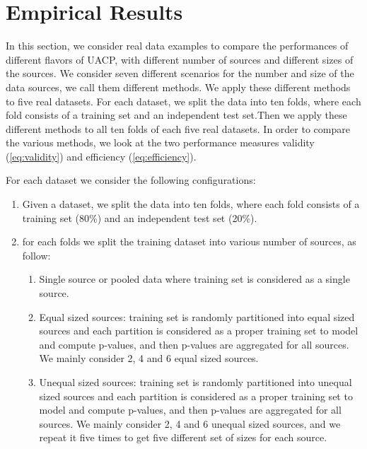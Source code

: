 \documentclass[main]{subfiles}
\begin{document}
\section{Empirical Results}\label{sec:results}
In this section, we consider real data examples to compare the performances of different flavors of UACP, with different number of sources and different sizes of the sources. We consider seven different scenarios for the number and size of the data sources, we call them different methods.  We apply these different methods to five real datasets. For each dataset, we split the data into ten folds, where each fold consists of a training set and an independent test set.Then we apply these different methods to all ten folds of each five real datasets. In order to compare the various methods, we look at the two performance measures validity (\ref{eq:validity}) and efficiency (\ref{eq:efficiency}). %

For each dataset we consider the following configurations:

\begin{enumerate}

\item Given a dataset, we split the data into ten folds, where each fold consists of a training set (80\%) and an independent test set (20\%).

\item for each folds we split the training dataset into various number of sources, as follow:
\begin{enumerate}
	\item Single source or pooled data  where training set is considered as a single source.
	\item Equal sized sources: training set is randomly partitioned into equal sized sources and  each partition is considered as a proper training set to model and compute p-values, and then p-values are aggregated for all sources. We mainly consider 2, 4 and 6 equal sized sources. %
	\item Unequal sized sources: training set is randomly partitioned into unequal sized sources and  each partition is considered as a proper training set to model and compute p-values, and then p-values are aggregated for all sources. We mainly consider 2, 4 and 6 unequal sized sources, and we repeat it five times to get five different set of sizes for each source.

\end{enumerate}

\end{enumerate}
\end{document}
